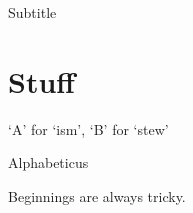 \documentclass[a4paper,openany]{book}
\begin{document}
%
	{Subtitle}%

\mainmatter

\chapter{Stuff}

\epigraph{`A' for `ism', `B' for `stew'}{Alphabeticus}

\begin{multicols}{2}

Beginnings are always tricky.

\end{multicols}
\end{document}
